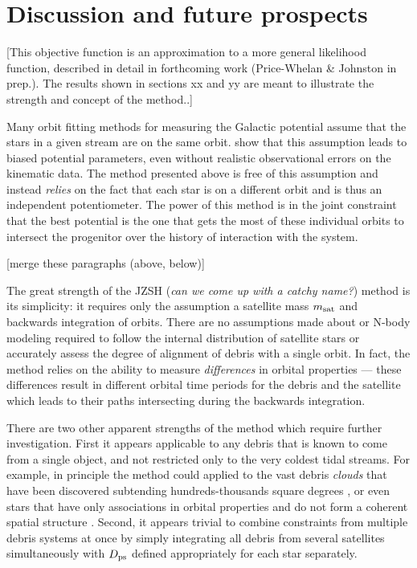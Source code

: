 \documentclass[preprint]{aastex}
\begin{document}

\section{Discussion and future prospects}

[This objective function is an approximation to a more general likelihood function, described in detail in forthcoming work (Price-Whelan \& Johnston in prep.). The results shown in sections xx and yy are meant to illustrate the strength and concept of the method..]

Many orbit fitting methods for measuring the Galactic potential assume that the stars in a given stream are on the same
orbit. \cite{binney??} show that this assumption leads to biased
potential parameters, even without realistic observational errors on
the kinematic data. The method presented above is
free of this assumption and instead \emph{relies} on the fact that
each star is on a different orbit and is thus an independent potentiometer. The power of this method is in
the joint constraint that the best potential is the one that gets the
most of these individual orbits to intersect the progenitor
over the history of interaction with the system.

[merge these paragraphs (above, below)]

The great strength of the  JZSH ({\it can we come up with a catchy name?}) method is its simplicity:
it requires only the assumption a satellite mass $m_{\rm sat}$ and  backwards integration of orbits.
There are no assumptions made about or N-body modeling required to follow the internal distribution of satellite stars or accurately assess the degree of alignment of
debris with a single orbit.
In fact, the method relies on the ability to measure {\it differences} in orbital properties --- these differences result in different orbital time periods for the debris and the
satellite which leads to their paths intersecting during the backwards integration.

There are two other apparent strengths of the method which require further investigation.
First it appears applicable to any debris that is known to come from a single object, and not restricted only to the very coldest tidal streams. For example, in principle the
method could  applied to the vast debris {\it clouds} that have been discovered subtending hundreds-thousands square degrees \citep[e.g. the Triangulum Andromeda
and Hercules-Aquila clouds]{rochapinto04,belokurov06}, or even stars that have only associations in orbital properties and do not form a coherent spatial structure
\citep[such as the angular momentum groupings in local giants found by][]{helmi99}.
Second, it appears trivial to combine constraints from multiple debris systems at once by simply integrating all debris from several satellites simultaneously with $D_{\rm
ps}$ defined appropriately for each star separately.
\end{document}
